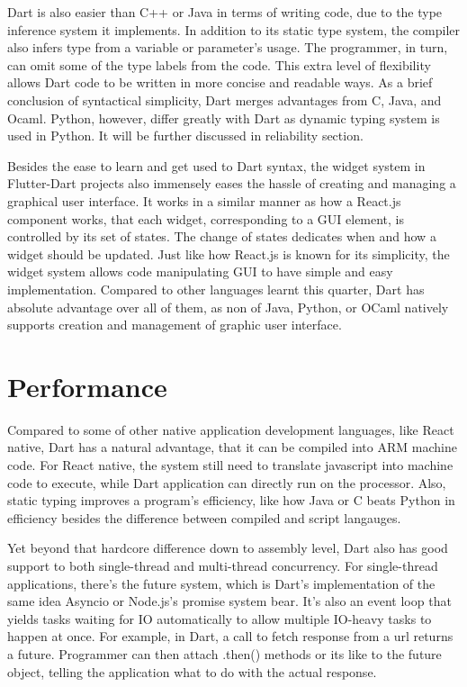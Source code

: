 \documentclass[letterpaper,twocolumn,10pt]{article}
\begin{document}
Dart is also easier than C++ or Java in terms of writing code, due to the type inference system it implements.
In addition to its static type system, the compiler also infers type from a variable or parameter's usage.
The programmer, in turn, can omit some of the type labels from the code.
This extra level of flexibility allows Dart code to be written in more concise and readable ways.
As a brief conclusion of syntactical simplicity, Dart merges advantages from C, Java, and Ocaml.
Python, however, differ greatly with Dart as dynamic typing system is used in Python.
It will be further discussed in reliability section.

Besides the ease to learn and get used to Dart syntax, the widget system in Flutter-Dart projects also immensely eases the hassle of creating and managing a graphical user interface.
It works in a similar manner as how a React.js component works, that each widget, corresponding to a GUI element, is controlled by its set of states.
The change of states dedicates when and how a widget should be updated.
Just like how React.js is known for its simplicity, the widget system allows code manipulating GUI to have simple and easy implementation.
Compared to other languages learnt this quarter, Dart has absolute advantage over all of them, 
as non of Java, Python, or OCaml natively supports creation and management of graphic user interface.

\section{Performance}

Compared to some of other native application development languages, like React native, Dart has a natural advantage, that it can be compiled into ARM machine code.
For React native, the system still need to translate javascript into machine code to execute, while Dart application can directly run on the processor.
Also, static typing improves a program's efficiency, like how Java or C beats Python in efficiency besides the difference between compiled and script langauges.

Yet beyond that hardcore difference down to assembly level, Dart also has good support to both single-thread and multi-thread concurrency.
For single-thread applications, there's the future system, which is Dart's implementation of the same idea Asyncio or Node.js's promise system bear.
It's also an event loop that yields tasks waiting for IO automatically to allow multiple IO-heavy tasks to happen at once.
For example, in Dart, a call to fetch response from a url returns a future. 
Programmer can then attach .then() methods or its like to the future object, telling the application what to do with the actual response.
\end{document}
